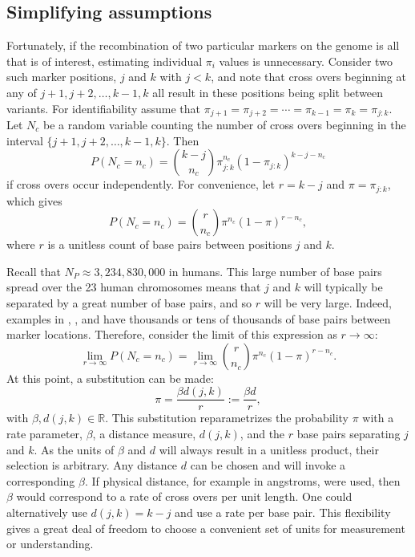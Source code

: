 \documentclass[sts]{imsart}
\newcommand{\field}[1]{\mathbb{#1}}
\newcommand{\Reals}{\field{R}}
\begin{document}
\subsection{Simplifying assumptions} \label{subsec:simplify}

Fortunately, if the recombination of two particular markers on the genome is all that is of interest, estimating individual $\pi_i$ values is unnecessary. Consider two such marker positions, $j$ and $k$ with $j < k$, and note that cross overs beginning at any of $j+1, j+2, \dots, k-1, k$ all result in these positions being split between variants. For identifiability assume that $\pi_{j+1} = \pi_{j+2} = \cdots = \pi_{k-1} = \pi_k = \pi_{j:k}$. Let $N_c$ be a random variable counting the number of cross overs beginning in the interval $\{j+1,j+2,\dots,k-1,k\}$. Then
$$P(N_c = n_c) = {k - j \choose n_c} \pi_{j:k}^{n_c} (1-\pi_{j:k})^{k - j - n_c}$$
if cross overs occur independently. For convenience, let $r = k - j$ and $\pi = \pi_{j:k}$, which gives
\begin{equation} \label{eq:binomialDist}
  P(N_c = n_c) = {r \choose n_c} \pi^{n_c} (1-\pi)^{r - n_c},
\end{equation}
where $r$ is a unitless count of base pairs between positions $j$ and $k$.

Recall that $N_P \approx 3,234,830,000$ in humans. This large number of base pairs spread over the 23 human chromosomes means that $j$ and $k$ will typically be separated by a great number of base pairs, and so $r$ will be very large. Indeed, examples in \cite{nyholt2004}, \cite{Salyakina2005}, and \cite{Galwey2009} have thousands or tens of thousands of base pairs between marker locations. Therefore, consider the limit of this expression as $r \rightarrow \infty$:
$$\lim_{r \rightarrow \infty} P(N_c = n_c) = \lim_{r \rightarrow \infty} {r \choose n_c} \pi^{n_c} (1-\pi)^{r - n_c}.$$
At this point, a substitution can be made:
$$\pi = \frac{\beta d(j,k)}{r} := \frac{\beta d}{r},$$
with $\beta, d(j,k) \in \Reals$. This substitution reparametrizes the probability $\pi$ with a rate parameter, $\beta$, a distance measure, $d(j,k)$, and the $r$ base pairs separating $j$ and $k$. As the units of $\beta$ and $d$ will always result in a unitless product, their selection is arbitrary. Any distance $d$ can be chosen and will invoke a corresponding $\beta$. If physical distance, for example in angstroms, were used, then $\beta$ would correspond to a rate of cross overs per unit length. One could alternatively use $d(j,k)=k-j$ and use a rate per base pair. This flexibility gives a great deal of freedom to choose a convenient set of units for measurement or understanding.
\end{document}
